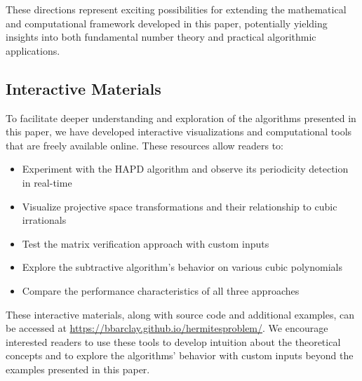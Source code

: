 These directions represent exciting possibilities for extending the mathematical and computational framework developed in this paper, potentially yielding insights into both fundamental number theory and practical algorithmic applications.

\subsection{Interactive Materials}

To facilitate deeper understanding and exploration of the algorithms presented in this paper, we have developed interactive visualizations and computational tools that are freely available online. These resources allow readers to:

\begin{itemize}
\item Experiment with the HAPD algorithm and observe its periodicity detection in real-time
\item Visualize projective space transformations and their relationship to cubic irrationals
\item Test the matrix verification approach with custom inputs
\item Explore the subtractive algorithm's behavior on various cubic polynomials
\item Compare the performance characteristics of all three approaches
\end{itemize}

These interactive materials, along with source code and additional examples, can be accessed at \url{https://bbarclay.github.io/hermitesproblem/}. We encourage interested readers to use these tools to develop intuition about the theoretical concepts and to explore the algorithms' behavior with custom inputs beyond the examples presented in this paper.
